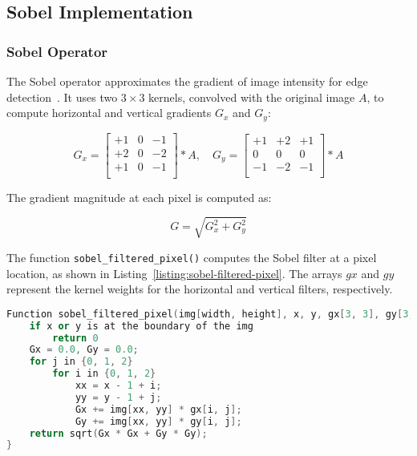 \subsection{Sobel Implementation}
\label{subsec:sobel-implementation}

\subsubsection{Sobel Operator}
\label{subsubsec:sobel-operator}

The Sobel operator approximates the gradient of image intensity for edge detection~\cite{kanopoulos1988design}. It uses two \(3 \times 3\) kernels, convolved with the original image \( A \), to compute horizontal and vertical gradients \( G_x \) and \( G_y \):

\[
G_x = \begin{bmatrix}
+1 & 0 & -1 \\
+2 & 0 & -2 \\
+1 & 0 & -1 \\
\end{bmatrix} * A,
\quad
G_y = \begin{bmatrix}
+1 & +2 & +1 \\
0  &  0 &  0 \\
-1 & -2 & -1 \\
\end{bmatrix} * A
\]

The gradient magnitude at each pixel is computed as:

\[
G = \sqrt{G_x^2 + G_y^2}
\]

The function \texttt{sobel\_filtered\_pixel()} computes the Sobel filter at a pixel location, as shown in Listing~\ref{listing:sobel-filtered-pixel}. The arrays \( gx \) and \( gy \) represent the kernel weights for the horizontal and vertical filters, respectively.

\begin{lstlisting}[caption={\textbf{Sobel filtered pixel computation.} Computes the Sobel filter at a specific pixel location.},label={listing:sobel-filtered-pixel},float=htbp,style=mystyle,language=C++]
Function sobel_filtered_pixel(img[width, height], x, y, gx[3, 3], gy[3, 3]) {
    if x or y is at the boundary of the img
        return 0
    Gx = 0.0, Gy = 0.0;
    for j in {0, 1, 2}
        for i in {0, 1, 2}
            xx = x - 1 + i;
            yy = y - 1 + j;
            Gx += img[xx, yy] * gx[i, j];
            Gy += img[xx, yy] * gy[i, j];
    return sqrt(Gx * Gx + Gy * Gy);
}
\end{lstlisting}

